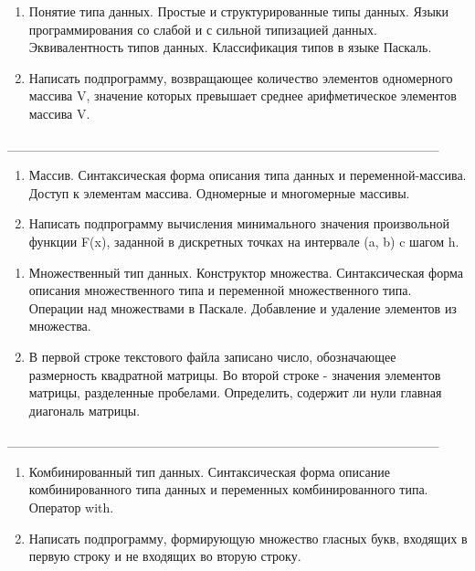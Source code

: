 \documentclass[oneside, final, 14pt]{extreport}
\newcommand{\cutline}{\_\_\_\_\_\_\_\_\_\_\_\_\_\_\_\_\_\_\_\_\_\_\_\_\_\_\_\_\_\_\_\_\_\_\_\_\_\_\_\_\_\_\_\_\_}
\begin{document}

\begin{enumerate}
\item Понятие типа данных. Простые и структурированные типы данных. Языки программирования со слабой и с сильной типизацией данных. Эквивалентность типов данных.
Классификация типов в языке Паскаль.
\item Написать подпрограмму, возвращающее количество элементов одномерного массива V, значение которых превышает среднее арифметическое элементов массива V.
\end{enumerate}


\cutline


\begin{enumerate}
\item Массив. Синтаксическая форма описания типа данных и переменной-массива.
Доступ к элементам массива. Одномерные и многомерные массивы.
\item Написать подпрограмму вычисления минимального значения произвольной функции F(x), заданной в дискретных точках на интервале (a, b) c шагом h.
\end{enumerate}


\newpage


\begin{enumerate}
\item Множественный тип данных. Конструктор множества. 
Синтаксическая форма описания множественного типа и переменной множественного типа.
Операции над множествами в Паскале. Добавление и удаление элементов из множества.
\item В первой строке текстового файла записано число, обозначающее размерность квадратной матрицы. Во второй строке - значения элементов матрицы, разделенные пробелами. 
Определить, содержит ли нули главная диагональ матрицы.
\end{enumerate}


\cutline


\begin{enumerate}
\item Комбинированный тип данных. Синтаксическая форма описание комбинированного типа данных 
    и переменных комбинированного типа. Оператор with.
\item Написать подпрограмму, формирующую множество гласных букв, входящих в первую строку
   и не входящих во вторую строку.
\end{enumerate}

\end{document}
